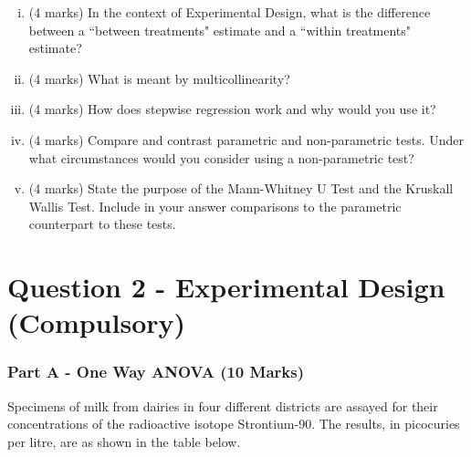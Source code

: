 \documentclass[a4paper,12pt]{article}
\begin{document}
\begin{enumerate}[(i)]
	
	
	
	\item (4 marks) In the context of Experimental Design, what is the difference between a ``between treatments" estimate and a ``within
	treatments" estimate?
	
	
	
	
	\item  (4 marks) What is meant by multicollinearity?

	
	\item (4 marks) How does stepwise regression work and why would you use it?

	\item (4 marks) Compare and contrast parametric and non-parametric tests. Under what circumstances would you consider using a non-parametric test?
	
	\item (4 marks) State the purpose of the Mann-Whitney U Test and the Kruskall Wallis Test. Include in your answer comparisons to the parametric counterpart to these tests.
	
\end{enumerate}
\newpage
\section*{Question 2 - Experimental Design (Compulsory)}
	\subsubsection*{Part A - One Way ANOVA (10 Marks)}
	Specimens of milk from dairies in four different districts are assayed for their concentrations of the radioactive isotope Strontium-90. 
	The results, in picocuries per litre, are as shown in the table below.
\end{document}
